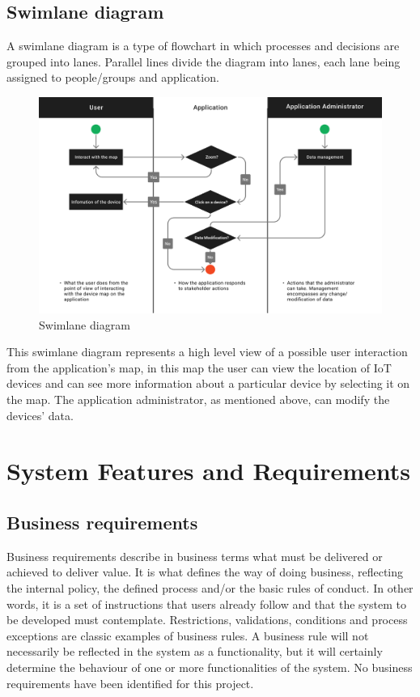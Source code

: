 \documentclass{scrreprt}
\begin{document}
\section{Swimlane diagram}

A swimlane diagram is a type of flowchart in which processes and decisions
are grouped into lanes. Parallel lines divide the diagram into lanes, each
lane being assigned to people/groups and application.
\begin{figure}[H]
    \centering
    \includegraphics[width=15cm]{assets/images/swimlane_diagram.png}
    \caption{Swimlane diagram}
    \label{fig:diagram swimlane}
\end{figure}
This swimlane diagram represents a high level view of a possible user interaction
from the application's map, in this map the user can view the location of
IoT devices and can see more information about a particular device by selecting
it on the map. The application administrator, as mentioned above, can modify the
devices' data.

\chapter{System Features and Requirements}

\section{Business requirements}

Business requirements describe in business terms what must be delivered
or achieved to deliver value. It is what defines the way of doing business,
reflecting the internal policy, the defined process and/or the basic rules
of conduct.  In other words, it is a set of instructions that users already
follow and that the system to be developed must contemplate. Restrictions,
validations, conditions and process exceptions are classic examples of business
rules. A business rule will not necessarily be reflected in the system as
a functionality, but it will certainly determine the behaviour of one or
more functionalities of the system.
\newline
No business requirements have been identified for this project.
\end{document}
